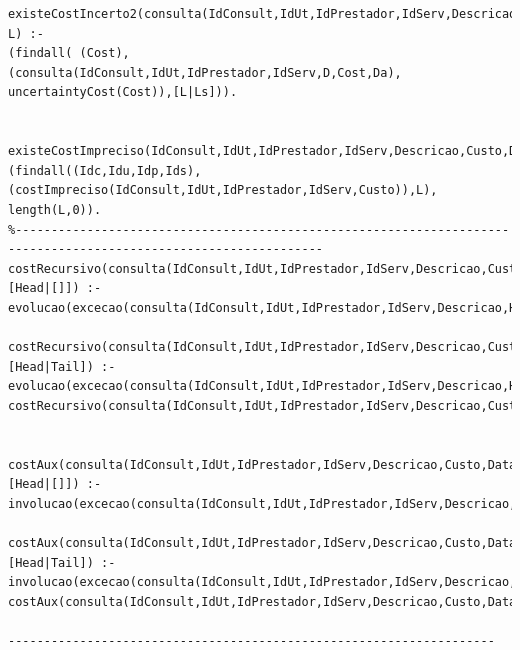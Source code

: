 \documentclass[25pt]{article}
\begin{document}
\begin{lstlisting}
existeCostIncerto2(consulta(IdConsult,IdUt,IdPrestador,IdServ,Descricao,Custo,Data), L) :- 
(findall( (Cost), (consulta(IdConsult,IdUt,IdPrestador,IdServ,D,Cost,Da), uncertaintyCost(Cost)),[L|Ls])).
                                                                 

existeCostImpreciso(IdConsult,IdUt,IdPrestador,IdServ,Descricao,Custo,Data):-
(findall((Idc,Idu,Idp,Ids),(costImpreciso(IdConsult,IdUt,IdPrestador,IdServ,Custo)),L),
length(L,0)).
%-----------------------------------------------------------------------------------------------------------------
costRecursivo(consulta(IdConsult,IdUt,IdPrestador,IdServ,Descricao,Custo,Data),[Head|[]]) :- 
evolucao(excecao(consulta(IdConsult,IdUt,IdPrestador,IdServ,Descricao,Head,Data))).

costRecursivo(consulta(IdConsult,IdUt,IdPrestador,IdServ,Descricao,Custo,Data),[Head|Tail]) :- 
evolucao(excecao(consulta(IdConsult,IdUt,IdPrestador,IdServ,Descricao,Head,Data))),
costRecursivo(consulta(IdConsult,IdUt,IdPrestador,IdServ,Descricao,Custo,Data),Tail).


costAux(consulta(IdConsult,IdUt,IdPrestador,IdServ,Descricao,Custo,Data),[Head|[]]) :- 
involucao(excecao(consulta(IdConsult,IdUt,IdPrestador,IdServ,Descricao,Head,Data))).

costAux(consulta(IdConsult,IdUt,IdPrestador,IdServ,Descricao,Custo,Data),[Head|Tail]) :- 
involucao(excecao(consulta(IdConsult,IdUt,IdPrestador,IdServ,Descricao,Head,Data))),
costAux(consulta(IdConsult,IdUt,IdPrestador,IdServ,Descricao,Custo,Data),Tail).

--------------------------------------------------------------------

\end{lstlisting}
\end{document}

